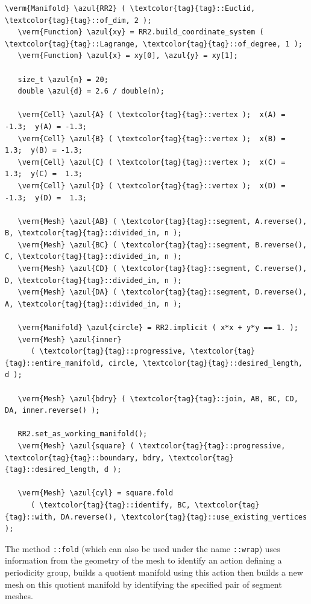 \begin{Verbatim}[commandchars=\\\{\},formatcom=\small\tt,frame=single,
   label=parag-\ref{\numb section 7.\numb parag 14}.cpp,rulecolor=\color{coment},
   baselinestretch=0.94,framesep=2mm                                             ]
   \verm{Manifold} \azul{RR2} ( \textcolor{tag}{tag}::Euclid, \textcolor{tag}{tag}::of_dim, 2 );
   \verm{Function} \azul{xy} = RR2.build_coordinate_system ( \textcolor{tag}{tag}::Lagrange, \textcolor{tag}{tag}::of_degree, 1 );
   \verm{Function} \azul{x} = xy[0], \azul{y} = xy[1];

   size_t \azul{n} = 20;
   double \azul{d} = 2.6 / double(n);

   \verm{Cell} \azul{A} ( \textcolor{tag}{tag}::vertex );  x(A) = -1.3;  y(A) = -1.3;
   \verm{Cell} \azul{B} ( \textcolor{tag}{tag}::vertex );  x(B) =  1.3;  y(B) = -1.3;
   \verm{Cell} \azul{C} ( \textcolor{tag}{tag}::vertex );  x(C) =  1.3;  y(C) =  1.3;
   \verm{Cell} \azul{D} ( \textcolor{tag}{tag}::vertex );  x(D) = -1.3;  y(D) =  1.3;

   \verm{Mesh} \azul{AB} ( \textcolor{tag}{tag}::segment, A.reverse(), B, \textcolor{tag}{tag}::divided_in, n );
   \verm{Mesh} \azul{BC} ( \textcolor{tag}{tag}::segment, B.reverse(), C, \textcolor{tag}{tag}::divided_in, n );
   \verm{Mesh} \azul{CD} ( \textcolor{tag}{tag}::segment, C.reverse(), D, \textcolor{tag}{tag}::divided_in, n );
   \verm{Mesh} \azul{DA} ( \textcolor{tag}{tag}::segment, D.reverse(), A, \textcolor{tag}{tag}::divided_in, n );

   \verm{Manifold} \azul{circle} = RR2.implicit ( x*x + y*y == 1. );
   \verm{Mesh} \azul{inner}
      ( \textcolor{tag}{tag}::progressive, \textcolor{tag}{tag}::entire_manifold, circle, \textcolor{tag}{tag}::desired_length, d );

   \verm{Mesh} \azul{bdry} ( \textcolor{tag}{tag}::join, AB, BC, CD, DA, inner.reverse() );

   RR2.set_as_working_manifold();
   \verm{Mesh} \azul{square} ( \textcolor{tag}{tag}::progressive, \textcolor{tag}{tag}::boundary, bdry, \textcolor{tag}{tag}::desired_length, d );

   \verm{Mesh} \azul{cyl} = square.fold
      ( \textcolor{tag}{tag}::identify, BC, \textcolor{tag}{tag}::with, DA.reverse(), \textcolor{tag}{tag}::use_existing_vertices );
\end{Verbatim}

The method {\small\tt{}::fold} (which can also be used under the name
{\small\tt{}::wrap}) uses information from the geometry of the mesh
to identify an action defining a periodicity group,
builds a quotient manifold using this action then builds a new mesh on this quotient manifold
by identifying the specified pair of segment meshes.


